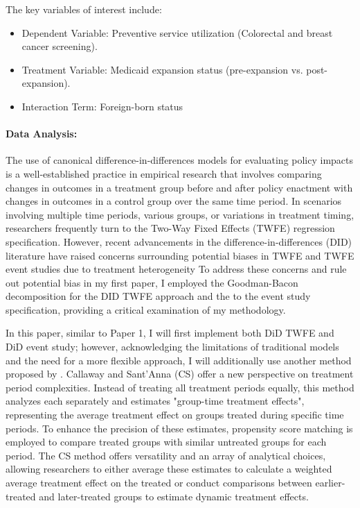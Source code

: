 \documentclass[man]{apa7}
\begin{document}
The key variables of interest include:

\begin{itemize}
\item Dependent Variable: Preventive service utilization (Colorectal and breast cancer screening).

\item Treatment Variable: Medicaid expansion status (pre-expansion vs. post-expansion).

\item Interaction Term: Foreign-born status

\end{itemize}

\paragraph{Data Analysis:} 
The use of canonical difference-in-differences models for evaluating policy impacts is a well-established practice in empirical research that involves comparing changes in outcomes in a treatment group before and after policy enactment with changes in outcomes in a control group over the same time period. In scenarios involving multiple time periods, various groups, or variations in treatment timing, researchers frequently turn to the Two-Way Fixed Effects (TWFE) regression specification. However, recent advancements in the difference-in-differences (DID) literature have raised concerns surrounding potential biases in TWFE and TWFE event studies due to treatment heterogeneity \parencite{goodman-bacon_difference--differences_2021,roth_whats_2023,sun_estimating_2021,imbens_potential_2020} To address these concerns and rule out potential bias in my first paper, I employed the Goodman-Bacon decomposition for the DID TWFE approach and the \textcite{sun_estimating_2021} to the event study specification, providing a critical examination of my methodology.

In this paper, similar to Paper 1, I will first implement both DiD TWFE and DiD event study; however, acknowledging the limitations of traditional models and the need for a more flexible approach, I will additionally use another method proposed by \textcite{callaway_difference--differences_2021}. Callaway and Sant'Anna (CS) offer a new perspective on treatment period complexities. Instead of treating all treatment periods equally, this method analyzes each separately and estimates "group-time treatment effects", representing the average treatment effect on groups treated during specific time periods. To enhance the precision of these estimates, propensity score matching is employed to compare treated groups with similar untreated groups for each period. The CS method offers versatility and an array of analytical choices, allowing researchers to either average these estimates to calculate a weighted average treatment effect on the treated or conduct comparisons between earlier-treated and later-treated groups to estimate dynamic treatment effects.
\end{document}
